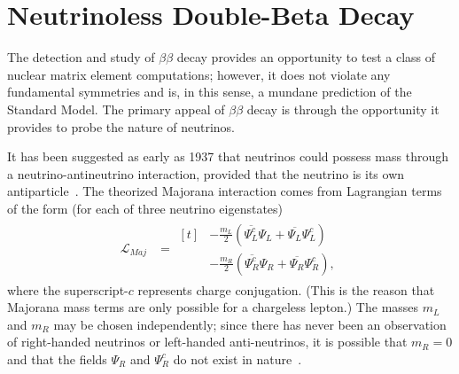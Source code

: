 \section{Neutrinoless Double-Beta Decay}

The detection and study of $\beta\beta$ decay provides an opportunity to test a class of nuclear matrix element computations; however, it does not violate any fundamental symmetries and is, in this sense, a mundane prediction of the Standard Model.  The primary appeal of $\beta\beta$ decay is through the opportunity it provides to probe the nature of neutrinos.

It has been suggested as early as 1937 that neutrinos could possess mass through a neutrino-antineutrino interaction, provided that the neutrino is its own antiparticle~\cite{Majorana}.  The theorized Majorana interaction comes from Lagrangian terms of the form (for each of three neutrino eigenstates)
\begin{align}
\mathcal{L}_{Maj}&= \begin{aligned}[t]
 & -\frac{m_{L}}{2} \left( \overline{\Psi_L^c} \Psi_L^{} + \overline{\Psi_L^{}} \Psi_L^c \right)\\
 & -\frac{m_{R}}{2} \left( \overline{\Psi_R^c} \Psi_R^{} + \overline{\Psi_R^{}} \Psi_R^c \right),
\end{aligned}
\end{align}
where the superscript-$c$ represents charge conjugation.  (This is the reason that Majorana mass terms are only possible for a chargeless lepton.)  The masses $m_L$ and $m_R$ may be chosen independently; since there has never been an observation of right-handed neutrinos or left-handed anti-neutrinos, it is possible that $m_R = 0$ and that the fields $\Psi_R^{}$ and $\Psi_R^c$ do not exist in nature~\cite{RMPbb0n}.

